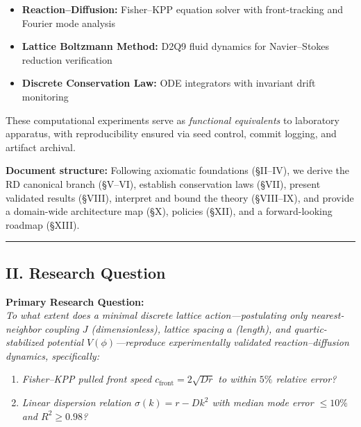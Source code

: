 \documentclass[
]{article}
\providecommand{\tightlist}{%
  \setlength{\itemsep}{0pt}\setlength{\parskip}{0pt}}
\begin{document}
\begin{itemize}
\tightlist
\item
  \textbf{Reaction--Diffusion:} Fisher--KPP equation solver with
  front-tracking and Fourier mode analysis
\item
  \textbf{Lattice Boltzmann Method:} D2Q9 fluid dynamics for
  Navier--Stokes reduction verification\\
\item
  \textbf{Discrete Conservation Law:} ODE integrators with invariant
  drift monitoring
\end{itemize}

These computational experiments serve as \emph{functional equivalents}
to laboratory apparatus, with reproducibility ensured via seed control,
commit logging, and artifact archival.

\textbf{Document structure:} Following axiomatic foundations (§II--IV),
we derive the RD canonical branch (§V--VI), establish conservation laws
(§VII), present validated results (§VIII), interpret and bound the
theory (§VIII--IX), and provide a domain-wide architecture map (§X),
policies (§XII), and a forward-looking roadmap (§XIII).

\begin{center}\rule{0.5\linewidth}{0.5pt}\end{center}

\hypertarget{ii.-research-question}{%
\subsection{II. Research Question}\label{ii.-research-question}}

\textbf{Primary Research Question:}\\
\emph{To what extent does a minimal discrete lattice
action---postulating only nearest-neighbor coupling \(J\)
(dimensionless), lattice spacing \(a\) (length), and quartic-stabilized
potential \(V(\phi)\)---reproduce experimentally validated
reaction--diffusion dynamics, specifically:}

\begin{enumerate}
\def\labelenumi{\arabic{enumi}.}
\tightlist
\item
  \emph{Fisher--KPP pulled front speed \(c_{\text{front}} = 2\sqrt{Dr}\)
  to within \(5\%\) relative error?}
\item
  \emph{Linear dispersion relation \(\sigma(k) = r - Dk^{2}\) with
  median mode error \(\le 10\%\) and \(R^{2} \ge 0.98\)?}
\end{enumerate}
\end{document}
